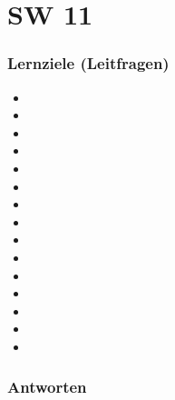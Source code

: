 \part{SW 11}
\section{Lernziele (Leitfragen)}
\begin{itemize}
    \item
    \item
    \item
    \item
    \item
    \item
    \item
    \item
    \item
    \item
    \item
    \item
    \item
    \item
    \item
\end{itemize}

\section{Antworten}
\subsection*{}